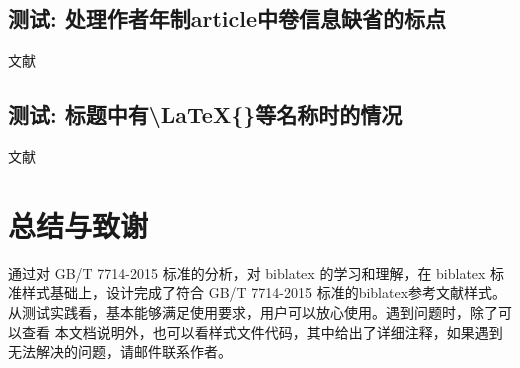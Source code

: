 \subsection{测试: 处理作者年制article中卷信息缺省的标点}
\label{sec:article:novol}
\begin{refsection}
文献\cite{刘彻东1998-38-39}\cite{亚洲地质图编目组1978-194-208}
\cite{高光明1998-60-65}

\printbibliography[heading=subbibliography,title=【author-year style: article without volume】]
\end{refsection}

\subsection{测试: 标题中有\textbackslash LaTeX\{\}等名称时的情况}\label{sec:with:latex}
\begin{refsection}
文献\cite{Peebles2001-100-100}\cite{赵凯华1995--}\cite{蒋有绪1998--}

\printbibliography[heading=subbibliography,title=【title with \textbackslash LaTeX\{\}】]
\end{refsection}


\section{总结与致谢}

通过对 GB/T 7714-2015 标准的分析，对 biblatex 的学习和理解，在 biblatex 标准样式基础上，设计完成了符合 GB/T 7714-2015 标准的biblatex参考文献样式。从测试实践看，基本能够满足使用要求，用户可以放心使用。遇到问题时，除了可以查看
本文档说明外，也可以看样式文件代码，其中给出了详细注释，如果遇到无法解决的问题，请邮件联系作者。


